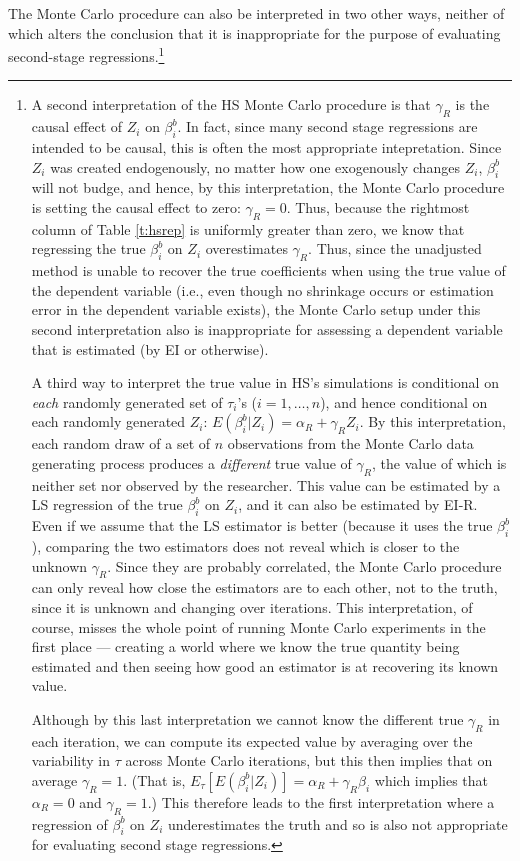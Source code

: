 \documentclass[11pt,titlepage]{article}
\begin{document}
The Monte Carlo procedure can also be interpreted in two other ways,
neither of which alters the conclusion that it is inappropriate for
the purpose of evaluating second-stage regressions.\footnote{A second
  interpretation of the HS Monte Carlo procedure is that $\gamma_R$ is
  the causal effect of $Z_i$ on $\beta_i^b$.  In fact, since many
  second stage regressions are intended to be causal, this is often
  the most appropriate intepretation.  Since $Z_i$ was created
  endogenously, no matter how one exogenously changes $Z_i$,
  $\beta_i^b$ will not budge, and hence, by this interpretation, the
  Monte Carlo procedure is setting the causal effect to zero:
  $\gamma_R=0$.  Thus, because the rightmost column of Table
  \ref{t:hsrep} is uniformly greater than zero, we know that
  regressing the true $\beta_i^b$ on $Z_i$ overestimates $\gamma_R$.
  Thus, since the unadjusted method is unable to recover the true
  coefficients when using the true value of the dependent variable
  (i.e., even though no shrinkage occurs or estimation error in the
  dependent variable exists), the Monte Carlo setup under this second
  interpretation also is inappropriate for assessing a dependent
  variable that is estimated (by EI or otherwise).
  
  A third way to interpret the true value in HS's simulations is
  conditional on \emph{each} randomly generated set of $\tau_i$'s
  ($i=1,\dots,n$), and hence conditional on each randomly generated
  $Z_i$: $E(\beta_i^b|Z_i)=\alpha_R+\gamma_R Z_i$.  By this
  interpretation, each random draw of a set of $n$ observations from
  the Monte Carlo data generating process produces a \emph{different}
  true value of $\gamma_R$, the value of which is neither set nor
  observed by the researcher.  This value can be estimated by a LS
  regression of the true $\beta_i^b$ on $Z_i$, and it can also be
  estimated by EI-R.  Even if we assume that the LS estimator is
  better (because it uses the true $\beta_i^b$), comparing the two
  estimators does not reveal which is closer to the unknown
  $\gamma_R$.  Since they are probably correlated, the Monte Carlo
  procedure can only reveal how close the estimators are to each
  other, not to the truth, since it is unknown and changing over
  iterations.  This interpretation, of course, misses the whole point
  of running Monte Carlo experiments in the first place --- creating a
  world where we know the true quantity being estimated and then
  seeing how good an estimator is at recovering its known value.
  
  Although by this last interpretation we cannot know the different
  true $\gamma_R$ in each iteration, we can compute its expected value
  by averaging over the variability in $\tau$ across Monte Carlo
  iterations, but this then implies that on average $\gamma_R=1$.
  (That is, $E_\tau[E(\beta_i^b|Z_i)]=\alpha_R+\gamma_R \beta_i$ which
  implies that $\alpha_R=0$ and $\gamma_R=1$.)  This therefore leads
  to the first interpretation where a regression of $\beta_i^b$ on
  $Z_i$ underestimates the truth and so is also not appropriate for
  evaluating second stage regressions.}
\end{document}
